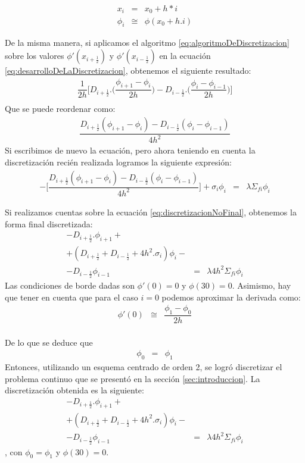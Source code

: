 \documentclass[11pt,a4paper]{emulateapj}
\begin{document}
\begin{eqnarray}
	x_i &=&x_0 + h*i \\
	\phi_i &\cong&\phi(x_0 + h.i)
\end{eqnarray}

De la misma manera, si aplicamos el algoritmo \ref{eq:algoritmoDeDiscretizacion} sobre los valores $\phi'(x_{i+\frac{1}{2}})$ y $\phi'(x_{i-\frac{1}{2}})$ en la ecuación \ref{eq:desarrolloDeLaDiscretizacion}, obtenemos el siguiente resultado:
\begin{eqnarray}
\label{eq:desarrolloDeLaDiscretizacion2}
	\dfrac{1}{2h} \bigg[	D_{i+\frac{1}{2}}.\bigg(\dfrac{\phi_{i+1} - \phi_{i}}{2h}\bigg) 	-
			D_{i-\frac{1}{2}}.\bigg(\dfrac{\phi_{i} - \phi_{i-1}}{2h}\bigg) \bigg]\\
\end{eqnarray}
Que se puede reordenar como:
\begin{eqnarray}
\label{eq:reemplazoDeLaDerivada}
	\dfrac{D_{i+\frac{1}{2}}(\phi_{i+1} - \phi_{i}) - D_{i-\frac{1}{2}}(\phi_{i} - \phi_{i-1})}{4h^2}
\end{eqnarray}
Si escribimos de nuevo la ecuación, pero ahora teniendo en cuenta la discretización recién realizada logramos la siguiente expresión:
\begin{eqnarray}
\label{eq:discretizacionNoFinal}
	-\bigg[\dfrac{D_{i+\frac{1}{2}}(\phi_{i+1} - \phi_{i}) - D_{i-\frac{1}{2}}(\phi_{i} - \phi_{i-1})}{4h^2}\bigg]
	+ \sigma_i \phi_i &=& \lambda \Sigma_{fi} \phi_i
\end{eqnarray}

Si realizamos cuentas sobre la ecuación \ref{eq:discretizacionNoFinal}, obtenemos la forma final discretizada:
\begin{eqnarray}
	-D_{i+\frac{1}{2}}.\phi_{i+1} + \\
	+(D_{i+\frac{1}{2}} + D_{i-\frac{1}{2}} + 4h^2.\sigma_i)\phi_{i} - \\
	-D_{i-\frac{1}{2}}\phi_{i-1} &=& \lambda 4h^2 \Sigma_{fi} \phi_i
\end{eqnarray}
Las condiciones de borde dadas son $\phi'(0) = 0$ y $\phi(30) = 0$. Asimismo, hay que tener en cuenta que para el caso $i = 0$ podemos aproximar la derivada como:
\begin{eqnarray}
	\phi'(0) &\cong & \dfrac{\phi_1 - \phi_0}{2h}
\end{eqnarray} \\
De lo que se deduce que
\begin{eqnarray}
	\phi_0 &=& \phi_1
\end{eqnarray}
Entonces, utilizando un esquema centrado de orden 2, se logró discretizar el problema continuo que se presentó en la sección \ref{sec:introduccion}. La discretización obtenida es la siguiente:
\begin{eqnarray}
\label{eq:expresionDicretizacion}
	-D_{i+\frac{1}{2}}.\phi_{i+1} + \\
	+(D_{i+\frac{1}{2}} + D_{i-\frac{1}{2}} + 4h^2.\sigma_i)\phi_{i} - \\
	-D_{i-\frac{1}{2}}\phi_{i-1} &=& \lambda 4h^2 \Sigma_{fi} \phi_i
\end{eqnarray}
, con $\phi_0 = \phi_1$ y $\phi(30) = 0$.
\end{document}
